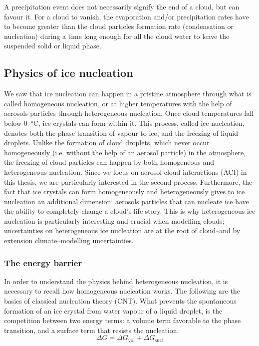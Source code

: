     A precipitation event does not necessarily signify the end of a cloud, but can favour it. 
    For a cloud to vanish, the evaporation and/or precipitation rates have to become greater than the cloud particles formation rate (condensation or nucleation) during a time long enough for all the cloud water to leave the suspended solid or liquid phase.

    \subsection{Physics of ice nucleation}
    \label{sec:ice_nucleation}

    We saw that ice nucleation can happen in a pristine atmosphere through what is called homogeneous nucleation, or at higher temperatures with the help of aerosols particles through heterogeneous nucleation.
    Once cloud temperatures fall below \SI{0}{\degreeCelsius}, ice crystals can form within it. This process, called ice nucleation, denotes both the phase transition of vapour to ice, and the freezing of liquid droplets.
    Unlike the formation of cloud droplets, which never occur homogeneously (i.e. without the help of an aerosol particle) in the atmosphere, the freezing of cloud particles can happen by both homogeneous and heterogeneous nucleation.
    Since we focus on aerosol-cloud interactions (ACI) in this thesis, we are particularly interested in the second process. Furthermore, the fact that ice crystals can form homogeneously and heterogeneously gives to ice nucleation an additional dimension: aerosols particles that can nucleate ice have the ability to completely change a cloud's life story. This is why heterogeneous ice nucleation is particularly interesting and crucial when modelling clouds; uncertainties on heterogeneous ice nucleation are at the root of cloud\---and by extension climate\---modelling uncertainties.

    \subsubsection{The energy barrier}
    \label{sec:energy_barrier}
    In order to understand the physics behind heterogeneous nucleation, it is necessary to recall how homogeneous nucleation works. The following are the basics of classical nucleation theory (CNT).
    What prevents the spontaneous formation of an ice crystal from water vapour of a liquid droplet, is the competition between two energy terms: a volume term favorable to the phase transition, and a surface term that resists the nucleation.
       \begin{equation}
           \Delta G = \Delta G_{\text{vol}} + \Delta G_{\text{surf}}
       \end{equation}

